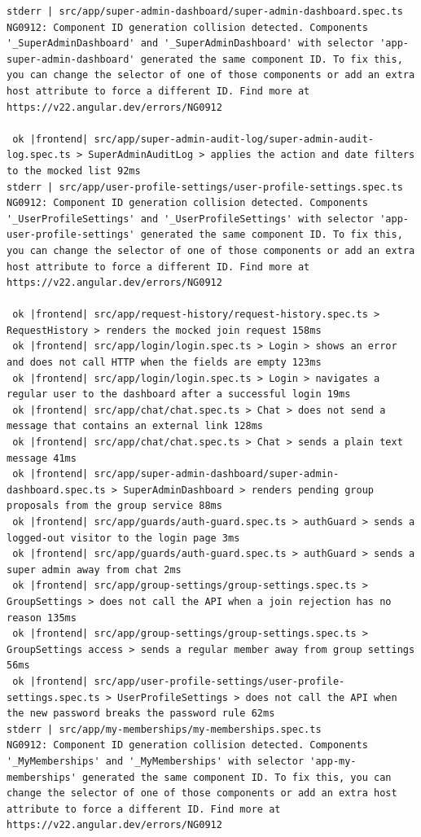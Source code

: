 \documentclass[10pt,a4paper]{article}
\begin{document}
\begin{Verbatim}[fontsize=\scriptsize,breaklines,frame=single]
stderr | src/app/super-admin-dashboard/super-admin-dashboard.spec.ts
NG0912: Component ID generation collision detected. Components '_SuperAdminDashboard' and '_SuperAdminDashboard' with selector 'app-super-admin-dashboard' generated the same component ID. To fix this, you can change the selector of one of those components or add an extra host attribute to force a different ID. Find more at https://v22.angular.dev/errors/NG0912

 ok |frontend| src/app/super-admin-audit-log/super-admin-audit-log.spec.ts > SuperAdminAuditLog > applies the action and date filters to the mocked list 92ms
stderr | src/app/user-profile-settings/user-profile-settings.spec.ts
NG0912: Component ID generation collision detected. Components '_UserProfileSettings' and '_UserProfileSettings' with selector 'app-user-profile-settings' generated the same component ID. To fix this, you can change the selector of one of those components or add an extra host attribute to force a different ID. Find more at https://v22.angular.dev/errors/NG0912

 ok |frontend| src/app/request-history/request-history.spec.ts > RequestHistory > renders the mocked join request 158ms
 ok |frontend| src/app/login/login.spec.ts > Login > shows an error and does not call HTTP when the fields are empty 123ms
 ok |frontend| src/app/login/login.spec.ts > Login > navigates a regular user to the dashboard after a successful login 19ms
 ok |frontend| src/app/chat/chat.spec.ts > Chat > does not send a message that contains an external link 128ms
 ok |frontend| src/app/chat/chat.spec.ts > Chat > sends a plain text message 41ms
 ok |frontend| src/app/super-admin-dashboard/super-admin-dashboard.spec.ts > SuperAdminDashboard > renders pending group proposals from the group service 88ms
 ok |frontend| src/app/guards/auth-guard.spec.ts > authGuard > sends a logged-out visitor to the login page 3ms
 ok |frontend| src/app/guards/auth-guard.spec.ts > authGuard > sends a super admin away from chat 2ms
 ok |frontend| src/app/group-settings/group-settings.spec.ts > GroupSettings > does not call the API when a join rejection has no reason 135ms
 ok |frontend| src/app/group-settings/group-settings.spec.ts > GroupSettings access > sends a regular member away from group settings 56ms
 ok |frontend| src/app/user-profile-settings/user-profile-settings.spec.ts > UserProfileSettings > does not call the API when the new password breaks the password rule 62ms
stderr | src/app/my-memberships/my-memberships.spec.ts
NG0912: Component ID generation collision detected. Components '_MyMemberships' and '_MyMemberships' with selector 'app-my-memberships' generated the same component ID. To fix this, you can change the selector of one of those components or add an extra host attribute to force a different ID. Find more at https://v22.angular.dev/errors/NG0912


\end{Verbatim}
\end{document}
